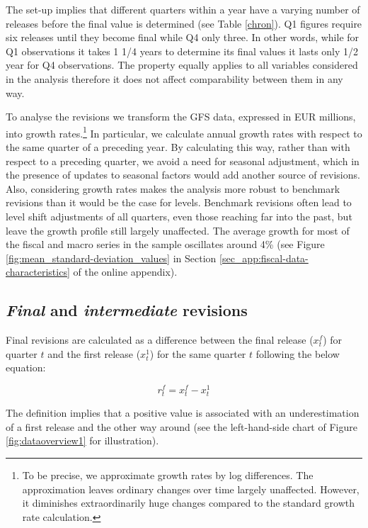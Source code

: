 The set-up implies that different quarters within a year have a varying number of releases before the final value is determined (see Table \ref{chron}). Q1 figures require six releases until they become final while Q4 only three. In other words, while for Q1 observations it takes 1 1/4 years to determine its final values it lasts only 1/2 year for Q4 observations. The property equally applies to all variables considered in the analysis therefore it does not affect comparability between them in any way.

To analyse the revisions we transform the GFS data, expressed in EUR millions, into growth rates.\footnote{To be precise, we approximate growth rates  by log differences. The approximation leaves ordinary changes over time largely unaffected. However, it diminishes extraordinarily huge changes compared to the standard growth rate calculation.} In particular, we calculate annual growth rates with respect to the same quarter of a preceding year. By calculating this way, rather than with respect to a preceding quarter, we avoid a need for seasonal adjustment, which in the presence of updates to seasonal factors would add another source of revisions. Also, considering growth rates makes the analysis more robust to benchmark revisions than it would be the case for levels. Benchmark revisions often lead to level shift adjustments of all quarters, even those reaching far into the past, but leave the growth profile still largely unaffected. The average growth for most of the fiscal and macro series in the sample oscillates around 4\% (see Figure \ref{fig:mean_standard-deviation_values} in Section \ref{sec_app:fiscal-data-characteristics} of the online appendix).

\subsection{\emph{Final} and \emph{intermediate} revisions\label{subsec:final_intermediate_revisions}}

Final revisions are calculated as a difference between the final release ($x_{t}^{f}$) for quarter $t$ and the first release ($x_{t}^{1}$) for the same quarter $t$ following the below equation:

\[
r_{t}^{f}=x_{t}^{f}-x_{t}^{1}
\]

The definition implies that a positive value is associated with an underestimation of a first release and the other way around (see the left-hand-side chart of Figure \ref{fig:dataoverview1} for illustration).

